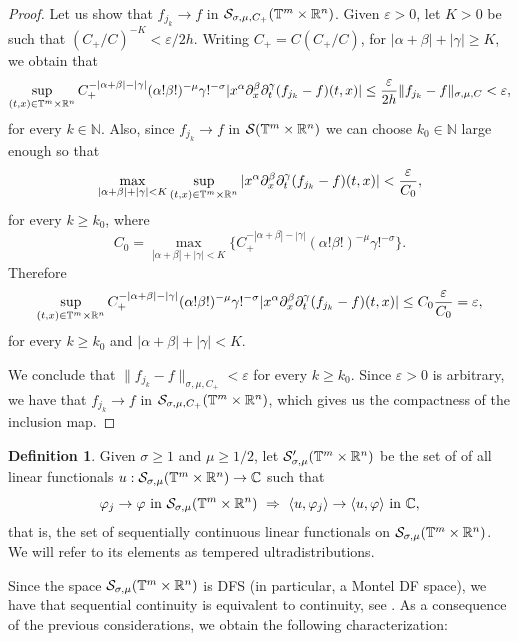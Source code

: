 \documentclass[11pt,reqno]{amsart}
\numberwithin{equation}{section}
\theoremstyle{definition}
\theoremstyle{definition}
\newtheorem{definition}[theorem]{Definition}
\newcommand{\G}{\mathnormal{\mathbb{T}^{m}\times\mathbb{R}^n}}
\newcommand{\N}{\mathbb{N}}
\renewcommand{\S}{\mathcal{S}_{\sigma,\mu}(\G)}
\renewcommand{\SS}{\mathcal{S}'_{\sigma,\mu}(\G)}
\begin{document}
\begin{proof}
    Let us show that $f_{j_k}\to f$ in $\mathcal{S}_{\sigma,\mu,C_+}(\G)$. Given $\varepsilon>0$, let $K>0$ be such that $(C_+/C)^{-K}<\varepsilon/2h$. Writing $C_+=C(C_+/C)$, for  $|\alpha+\beta|+|\gamma|\geq K$, we obtain that
    \[\sup_{(t,x)\in\G}C_+^{-|\alpha+\beta|-|\gamma|}(\alpha!\beta!)^{-\mu}\gamma!^{-\sigma}|x^\alpha\partial_x^\beta\partial_t^\gamma (f_{j_k}-f)(t,x)| \leq \frac{\varepsilon}{2h}\|f_{j_k}-f\|_{\sigma,\mu,C} < \varepsilon,\]
    for every $k\in\N$. Also, since $f_{j_k}\to f$ in $\mathcal{S}(\G)$ we can choose $k_0\in\mathbb{N}$ large enough so that
    \[\max_{|\alpha+\beta|+|\gamma|<K}\sup_{(t,x)\in\G}|x^\alpha\partial_x^\beta\partial_t^\gamma (f_{j_k}-f)(t,x)|<\frac{\varepsilon}{C_0},\]
    for every $k\geq k_0$, where
    \[C_0 = \displaystyle\max_{|\alpha+\beta|+|\gamma|<K}\{C_+^{-|\alpha+\beta|-|\gamma|}(\alpha!\beta!)^{-\mu}\gamma!^{-\sigma}\}.\]
    Therefore
    \[\sup_{(t,x)\in\G}C_+^{-|\alpha+\beta|-|\gamma|}(\alpha!\beta!)^{-\mu}\gamma!^{-\sigma}|x^\alpha\partial_x^\beta\partial_t^\gamma (f_{j_k}-f)(t,x)| \leq C_0\frac{\varepsilon}{C_0} = \varepsilon,\]
    for every $k\geq k_0$ and $|\alpha+\beta|+|\gamma|<K$.
    
    We conclude that $\|f_{j_k}-f\|_{\sigma,\mu,C_+}<\varepsilon$ for every $k\geq k_0$. Since $\varepsilon>0$ is arbitrary, we have that $f_{j_k}\to f$ in $\mathcal{S}_{\sigma,\mu,C_+}(\G)$, which gives us the compactness of the inclusion map.    
\end{proof}

\begin{definition}
    Given $\sigma\geq 1$ and $\mu\geq 1/2$, let $\SS$ be the set of of all linear functionals $u : \S \to \mathbb{C}$ such that
\[\varphi_j\to \varphi\ \text{in}\ \S\ \Rightarrow\ \langle u,\varphi_j\rangle\to\langle u,\varphi\rangle\ \text{in}\ \mathbb{C},\]
that is, the set of sequentially continuous linear functionals on $\S$. We will refer to its elements as tempered ultradistributions.
\end{definition}

Since the space $\S$ is DFS (in particular, a Montel DF space), we have that sequential continuity is equivalent to continuity, see \cite{Webb}. As a consequence of the previous considerations, we obtain the following characterization:
\end{document}
